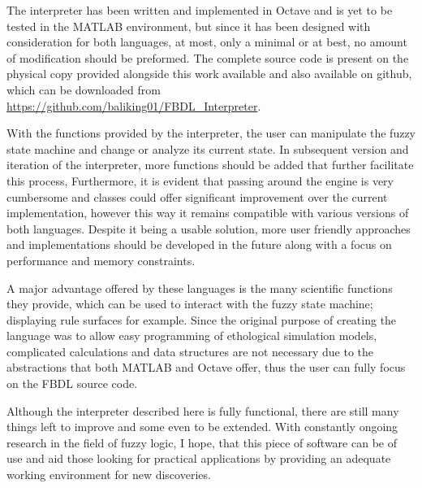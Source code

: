 The interpreter has been written and implemented in Octave and is yet to be tested in the MATLAB environment, but since it has been designed with consideration for both languages, at most, only a minimal or at best, no amount of modification should be preformed. The complete source code is present on the physical copy provided alongside this work available and also available on github, which can be downloaded from \url{https://github.com/baliking01/FBDL\_Interpreter}.

With the functions provided by the interpreter, the user can manipulate the fuzzy state machine and change or analyze its current state. In subsequent version and iteration of the interpreter, more functions should be added that further facilitate this process, Furthermore, it is evident that passing around the engine is very cumbersome and classes could offer significant improvement over the current implementation, however this way it remains compatible with various versions of both languages. Despite it being a usable solution, more user friendly approaches and implementations should be developed in the future along with a focus on performance and memory constraints.

A major advantage offered by these languages is the many scientific functions they provide, which can be used to interact with the fuzzy state machine; displaying rule surfaces for example. Since the original purpose of creating the language was to allow easy programming of ethological simulation models, complicated calculations and data structures are not necessary due to the abstractions that both MATLAB and Octave offer, thus the user can fully focus on the FBDL source code.

Although the interpreter described here is fully functional, there are still many things left to improve and some even to be extended. With constantly ongoing research in the field of fuzzy logic, I hope, that this piece of software can be of use and aid those looking for practical applications by providing an adequate working environment for new discoveries.